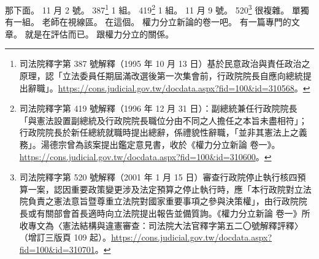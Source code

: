 \hypertarget{c01:cue:1533}{}那下面。
\hypertarget{c01:cue:1534}{}11 月 2 號。
\hypertarget{c01:cue:1535}{}387\footnote{司法院釋字第 387 號解釋（1995 年 10 月 13 日）基於民意政治與責任政治之原理，認「立法委員任期屆滿改選後第一次集會前，行政院院長自應向總統提出辭職」。\url{https://cons.judicial.gov.tw/docdata.aspx?fid=100&id=310568}。} 1 組。
\hypertarget{c01:cue:1536}{}419\footnote{司法院釋字第 419 號解釋（1996 年 12 月 31 日）：副總統兼任行政院院長「與憲法設置副總統及行政院院長職位分由不同之人擔任之本旨未盡相符」；行政院院長於新任總統就職時提出總辭，係禮貌性辭職，「並非其憲法上之義務」。湯德宗曾為該案提出鑑定意見書，收於《權力分立新論 卷一》。\url{https://cons.judicial.gov.tw/docdata.aspx?fid=100&id=310600}。} 1 組。
\hypertarget{c01:cue:1537}{}11 月 9 號。
\hypertarget{c01:cue:1538}{}520\footnote{司法院釋字第 520 號解釋（2001 年 1 月 15 日）審查行政院停止執行核四預算一案，認因重要政策變更涉及法定預算之停止執行時，應「本行政院對立法院負責之憲法意旨暨尊重立法院對國家重要事項之參與決策權」，由行政院院長或有關部會首長適時向立法院提出報告並備質詢。《權力分立新論 卷一》所收專文為〈憲法結構與違憲審查：司法院大法官釋字第五二〇號解釋評釋〉（增訂三版頁 109 起）。\url{https://cons.judicial.gov.tw/docdata.aspx?fid=100&id=310701}。} 很複雜。
\hypertarget{c01:cue:1539}{}單獨有一組。
\hypertarget{c01:cue:1540}{}老師在視線區。
\hypertarget{c01:cue:1541}{}在這個。
\hypertarget{c01:cue:1542}{}權力分立新論的卷一吧。
\hypertarget{c01:cue:1543}{}有一篇專門的文章。
\hypertarget{c01:cue:1544}{}就是在評估而已。
\hypertarget{c01:cue:1545}{}跟權力分立的關係。

